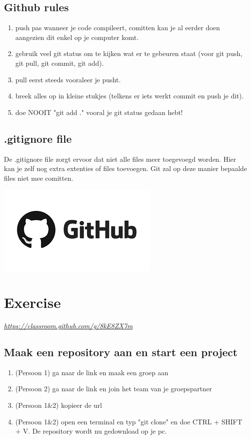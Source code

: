 \documentclass[a4paper, titlepage]{article}
\begin{document}
		\subsection{Github rules}
		\begin{enumerate}
			\item push pas wanneer je code compileert, comitten kan je al eerder doen aangezien dit enkel op je computer komt.
			\item gebruik veel git status om te kijken wat er te gebeuren staat (voor git push, git pull, git commit, git add).
			\item pull eerst steeds vooraleer je pusht.			
			\item breek alles op in kleine stukjes (telkens er iets werkt commit en push je dit).
			\item doe NOOIT "git add ." vooral je git status gedaan hebt!
		\end{enumerate}
		
		\subsection{.gitignore file}
			De .gitignore file zorgt ervoor dat niet alle files meer toegevoegd worden. Hier kan je zelf nog extra extenties of files toevoegen. Git zal op deze manier bepaalde files niet mee comitten.
		\pagebreak
	
	\includegraphics[scale=0.4]{img/github.png}
	\section{Exercise}
	\href{https://classroom.github.com/g/8kE8ZX7m}{\textit{https://classroom.github.com/g/8kE8ZX7m}}
		\subsection{Maak een repository aan en start een project}
			\begin{enumerate}
				\item (Persoon 1) ga naar de link en maak een groep aan
				\item (Persoon 2) ga naar de link en join het team van je groepspartner
				\item (Persoon 1\&2) kopieer de url
				\item (Persoon 1\&2) open een terminal en typ "git clone" en doe CTRL + SHIFT + V. De repository wordt nu gedownload op je pc.
			\end{enumerate}
\end{document}
